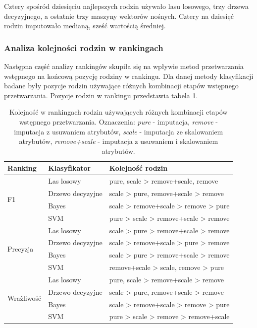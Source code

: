 \documentclass[../thesis.tex]{subfiles}
\begin{document}
Cztery spośród dziesięciu najlepszych rodzin używało lasu losowego, trzy drzewa decyzyjnego, a ostatnie trzy maszyny wektorów nośnych. Cztery na dziesięć rodzin imputowało medianą, sześć wartością średniej.

\subsubsection{Analiza kolejności rodzin w rankingach}

Następna część analizy rankingów skupiła się na wpływie metod przetwarzania wstępnego na końcową pozycję rodziny w rankingu. Dla danej metody klasyfikacji badane były pozycje rodzin używające różnych kombinacji etapów wstępnego przetwarzania. Pozycje rodzin w rankingu przedstawia tabela \ref{results:table_rankings}.

\begin{table}[h]
\begin{center}
\begin{tabular}{ | l | l | p{100mm} | }
\hline
\rowcolor{lightgray} Ranking & Klasyfikator & Kolejność rodzin \\\hline

\multirow{4}{*}{F1} & Las losowy & pure, scale > remove+scale, remove \\\cline{2-3}
                    & Drzewo decyzyjne & scale > pure, remove+scale > remove\\\cline{2-3}
                    & Bayes & scale > remove+scale > remove > pure\\\cline{2-3}
                    & SVM & pure > scale > remove+scale > remove\\\hline
\multirow{4}{*}{Precyzja} & Las losowy & scale > pure > remove+scale > remove \\\cline{2-3}
                    & Drzewo decyzyjne & scale > remove+scale > pure > remove\\\cline{2-3}
                    & Bayes & scale > pure > remove+scale > remove\\\cline{2-3}
                    & SVM & remove+scale > scale, remove > pure\\\hline
\multirow{4}{*}{Wrażliwość} & Las losowy & pure, scale > remove+scale > remove \\\cline{2-3}
                    & Drzewo decyzyjne & scale > pure, remove+scale > remove\\\cline{2-3}
                    & Bayes & scale > remove+scale > remove > pure\\\cline{2-3}
                    & SVM & pure > scale > remove > remove+scale\\\hline

\end{tabular}
\caption{Kolejność w rankingach rodzin używających różnych kombinacji etapów wstępnego przetwarzania. Oznaczenia: \emph{pure} - imputacja, \emph{remove} - imputacja z usuwaniem atrybutów, \emph{scale} - imputacja ze skalowaniem atrybutów, \emph{remove+scale} - imputacja z usuwaniem i skalowaniem atrybutów.}
\label{results:table_rankings}
\end{center}
\end{table}
\end{document}
